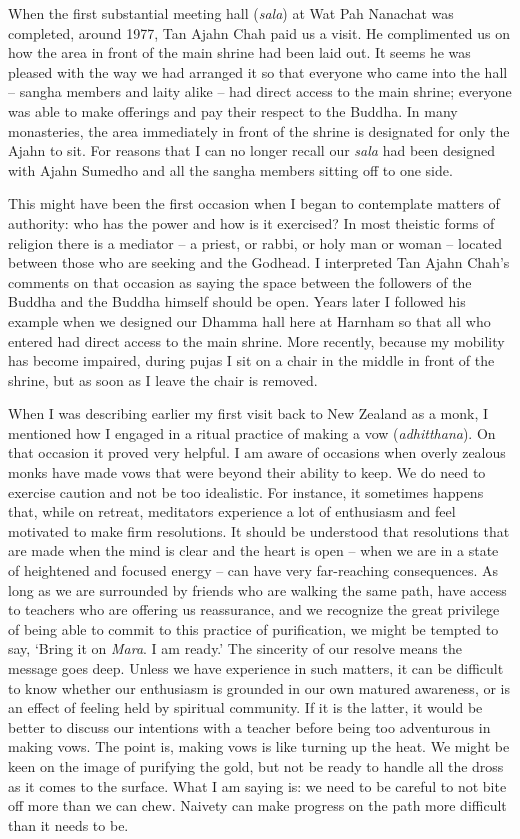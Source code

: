When the first substantial meeting hall (\emph{sala}) at Wat Pah
Nanachat was completed, around 1977, Tan Ajahn Chah paid us a visit. He
complimented us on how the area in front of the main shrine had been
laid out. It seems he was pleased with the way we had arranged it so
that everyone who came into the hall -- sangha members and laity alike
-- had direct access to the main shrine; everyone was able to make
offerings and pay their respect to the Buddha. In many monasteries, the
area immediately in front of the shrine is designated for only the Ajahn
to sit. For reasons that I can no longer recall our \emph{sala} had been
designed with Ajahn Sumedho and all the sangha members sitting off to
one side.

This might have been the first occasion when I began to contemplate
matters of authority: who has the power and how is it exercised? In most
theistic forms of religion there is a mediator -- a priest, or rabbi, or
holy man or woman -- located between those who are seeking and the
Godhead. I interpreted Tan Ajahn Chah's comments on that occasion as
saying the space between the followers of the Buddha and the Buddha
himself should be open. Years later I followed his example when we
designed our Dhamma hall here at Harnham so that all who entered had
direct access to the main shrine. More recently, because my mobility has
become impaired, during pujas I sit on a chair in the middle in front of
the shrine, but as soon as I leave the chair is removed.

When I was describing earlier my first visit back to New Zealand as a
monk, I mentioned how I engaged in a ritual practice of making a vow
(\emph{adhitthana}). On that occasion it proved very helpful. I am aware
of occasions when overly zealous monks have made vows that were beyond
their ability to keep. We do need to exercise caution and not be too
idealistic. For instance, it sometimes happens that, while on retreat,
meditators experience a lot of enthusiasm and feel motivated to make
firm resolutions. It should be understood that resolutions that are made
when the mind is clear and the heart is open -- when we are in a state
of heightened and focused energy -- can have very far-reaching
consequences. As long as we are surrounded by friends who are walking
the same path, have access to teachers who are offering us reassurance,
and we recognize the great privilege of being able to commit to this
practice of purification, we might be tempted to say, `Bring it on
\emph{Mara}. I am ready.' The sincerity of our resolve means the message
goes deep. Unless we have experience in such matters, it can be
difficult to know whether our enthusiasm is grounded in our own matured
awareness, or is an effect of feeling held by spiritual community. If it
is the latter, it would be better to discuss our intentions with a
teacher before being too adventurous in making vows. The point is,
making vows is like turning up the heat. We might be keen on the image
of purifying the gold, but not be ready to handle all the dross as it
comes to the surface. What I am saying is: we need to be careful to not
bite off more than we can chew. Naivety can make progress on the path
more difficult than it needs to be.

